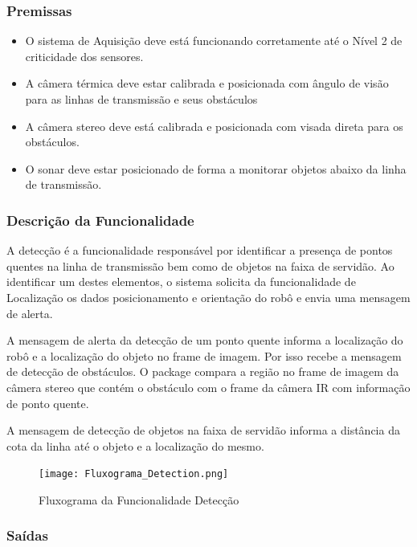 \subsubsection{Premissas}
\begin{itemize}
        	\item O sistema de Aquisição deve está funcionando corretamente até o Nível 2 de criticidade dos sensores.
            \item A câmera térmica deve estar calibrada e posicionada com ângulo de visão para as linhas de transmissão e seus obstáculos
            \item A câmera stereo deve está calibrada e posicionada com visada direta para os obstáculos.
            \item O sonar deve estar posicionado de forma a monitorar objetos abaixo da linha de transmissão.            
\end{itemize}

\subsubsection{Descrição da Funcionalidade}

A detecção é a funcionalidade responsável por identificar a presença de pontos quentes na linha de transmissão bem como de objetos na faixa de servidão. Ao identificar um destes elementos, o sistema solicita da funcionalidade de Localização os dados posicionamento e orientação do robô e envia uma mensagem de alerta.

A mensagem de alerta da detecção de um ponto quente informa a localização do robô e a localização do objeto no frame de imagem. Por isso recebe a mensagem de detecção de obstáculos. O package compara a região no frame de imagem da câmera stereo que contém o obstáculo com o frame da câmera IR com informação de ponto quente. 

A mensagem de detecção de objetos na faixa de servidão informa a distância da cota da linha até o objeto e a localização do mesmo. 

    \begin{figure}[!ht]
	\centering
	\texttt{[image: Fluxograma\_Detection.png]}
	\caption{Fluxograma da Funcionalidade Detecção} \label{FuncDetec}
	\end{figure}

\subsubsection{Saídas}

